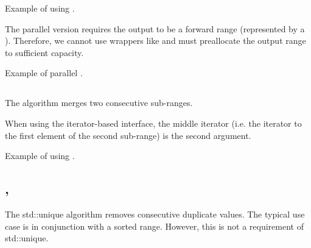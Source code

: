 \begin{box-note}
\footnotesize Example of using .
\tcblower
{}
\end{box-note}

The parallel version requires the output to be a forward range (represented by a ). Therefore, we cannot use wrappers like  and must preallocate the output range to sufficient capacity.

\begin{box-note}
\footnotesize Example of parallel .
\tcblower
{}
\end{box-note}

\subsection{\texorpdfstring{}{\texttt{std::inplace\_merge}}}

The  algorithm merges two consecutive sub-ranges.


When using the iterator-based interface, the middle iterator (i.e. the iterator to the first element of the second sub-range) is the second argument.

\begin{box-note}
\footnotesize Example of using .
\tcblower
{}
\end{box-note}

\subsection{\texorpdfstring{, }{\texttt{std::unique}, \texttt{std::unique\_copy}}}

The std::unique algorithm removes consecutive duplicate values. The typical use case is in conjunction with a sorted range. However, this is not a requirement of std::unique.


